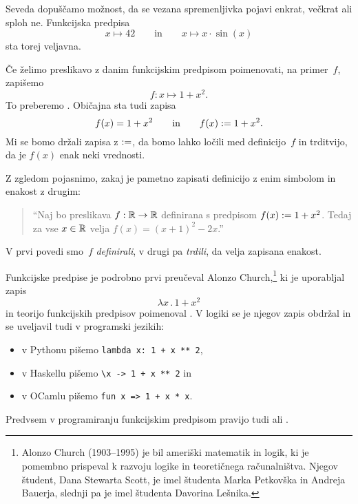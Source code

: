 Seveda dopuščamo možnost, da se vezana spremenljivka pojavi enkrat, večkrat ali sploh ne.
Funkcijska predpisa
%
%
\begin{equation*}
  x \mapsto 42
  \qquad\text{in}\qquad
  x \mapsto x \cdot \sin(x)
\end{equation*}
%
sta torej veljavna.

Če želimo preslikavo z danim funkcijskim predpisom poimenovati, na primer~$f$, zapišemo
%
\begin{equation*}
  f : x \mapsto 1 + x^2.
\end{equation*}
%
To preberemo . Običajna sta tudi zapisa
%
\begin{equation*}
  f(x) = 1 + x^2
  \qquad\text{in}\qquad
  f(x) \mathrel{{:}{=}} 1 + x^2.
\end{equation*}
%
Mi se bomo držali zapisa z $\mathrel{{:}{=}}$, da bomo lahko ločili med definicijo~$f$ in trditvijo, da je $f(x)$ enak neki vrednosti.

\begin{zgled}
  Z zgledom pojasnimo, zakaj je pametno zapisati definicijo z enim simbolom in enakost z drugim:
  \begin{quote}
    ``Naj bo preslikava $f : \mathbb{R} \to \mathbb{R}$ definirana s predpisom $f(x) \mathrel{{:}{=}} 1 + x^2$. Tedaj za vse $x \in \mathbb{R}$ velja $f(x) = (x + 1)^2 - 2 x$.'' 
  \end{quote}
  V prvi povedi smo~$f$ \emph{definirali}, v drugi pa \emph{trdili}, da velja zapisana enakost.
\end{zgled}

Funkcijske predpise je podrobno prvi preučeval Alonzo Church,\footnote{Alonzo Church
  (1903--1995) je bil ameriški matematik in logik, ki je pomembno prispeval k razvoju
  logike in teoretičnega računalništva. Njegov študent, Dana Stewarta Scott, je imel
  študenta Marka Petkovška in Andreja Bauerja, slednji pa je imel študenta Davorina
  Lešnika.} ki je uporabljal zapis
%
\begin{equation*}
  \lambda x \,.\, 1 + x^2
\end{equation*}
%
in teorijo funkcijskih predpisov poimenoval . V logiki se je njegov
zapis obdržal in se uveljavil tudi v programski jezikih:
%
\begin{itemize}
\item v Pythonu pišemo \verb|lambda x: 1 + x ** 2|,
\item v Haskellu pišemo \verb|\x -> 1 + x ** 2| in
\item v OCamlu pišemo \verb|fun x => 1 + x * x|.
\end{itemize}
%
Predvsem v programiranju funkcijskim predpisom pravijo tudi  ali .

